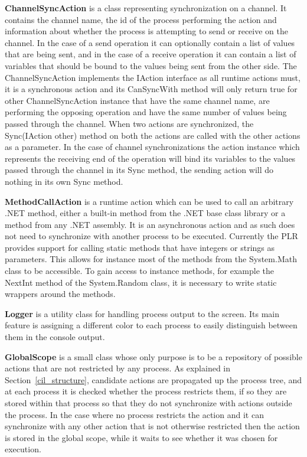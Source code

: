 	\textbf{ChannelSyncAction} is a class representing synchronization on a
	channel. It contains the channel name, the id of the process performing
	the action and information about whether the process is attempting to send
	or receive on the channel. In the case of a send operation it can optionally
	contain a list of values that are being sent, and in the case of a receive
	operation it can contain a list of variables that should be bound to the 
	values being sent from the other side. The \textsf{ChannelSyncAction}
	implements the \textsf{IAction} interface as all runtime actions must, it is
	a synchronous action and its \textsf{CanSyncWith} method will only return 
	true for other \textsf{ChannelSyncAction} instance that have the same
	channel name, are performing the opposing operation and have the same
	number of values being passed through the channel. When two actions are
	synchronized, the \textsf{Sync(IAction other)} method on both the actions
	are called with the other actions as a parameter. In the case of channel 
	synchronizations the action instance which represents the receiving end
	of the operation will bind its variables to the values passed through
	the channel in its \textsf{Sync} method, the sending action will do nothing
	in its own \textsf{Sync} method.
	
	\textbf{MethodCallAction} is a runtime action which can be used to call
	an arbitrary .NET method, either a built-in method from the .NET base
	class library or a method from any .NET assembly. It is an asynchronous 
	action and as such does not need to synchronize with another process to be 
	executed. Currently	the PLR provides support for calling static methods 
	that have integers or	strings as parameters. This allows for instance most
	of the methods from the \textsf{System.Math} class to be accessible. To
	gain access to instance methods, for example the \textsf{NextInt} method
	of the \textsf{System.Random} class, it is necessary to write static wrappers
	around the methods.

	\textbf{Logger} is a utility class for handling process output to the screen.
	Its main feature is assigning a different color to each process to 
	easily distinguish between them in the console output.

	\textbf{GlobalScope} is a small class whose only purpose is to be a 
	repository of possible actions that are not restricted by any process. As
	explained in Section~\ref{cil_structure}, candidate actions are propagated up 
	the process tree, and at each process it is checked whether the process 
	restricts them, if so they are stored within that process so that they do
	not synchronize with actions outside the process. In the case where no
	process restricts the action and it can synchronize with any other action
	that is not otherwise restricted then the action is stored in the global scope,
	while it waits to see whether it was chosen for execution.
	
